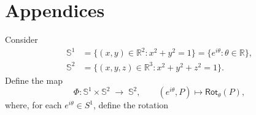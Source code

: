 \documentclass[11pt,openany]{article}
\begin{document}
\section{Appendices}
\iffalse
Consider \begin{align*}
	\mathbb{S}^1&=\{(x,y)\in\mathbb{R}^2 : x^2+y^2=1\}=\{e^{i\theta}: \theta\in\mathbb{R}\},\\
	\mathbb{S}^2&=\{(x,y,z)\in\mathbb{R}^3 : x^2+y^2+z^2=1\}.
\end{align*}
Define the map  
\[
\Phi\colon \mathbb{S}^1\times \mathbb{S}^2 \;\longrightarrow\; \mathbb{S}^2,\qquad (e^{i\theta},P)\mapsto\mathsf{Rot}_\theta(P),
\] where, for each  \(e^{i\theta}\in S^1\), define the rotation  
\end{document}
